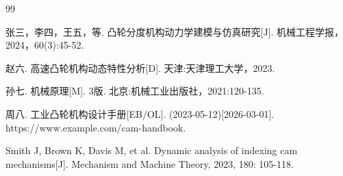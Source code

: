 \begin{thebibliography}{99}

 张三，李四，王五，等. 凸轮分度机构动力学建模与仿真研究[J]. 机械工程学报，2024，60(3):45-52.

 赵六. 高速凸轮机构动态特性分析[D]. 天津:天津理工大学，2023.

 孙七. 机械原理[M]. 3版. 北京:机械工业出版社，2021:120-135.

 周八. 工业凸轮机构设计手册[EB/OL]. (2023-05-12)[2026-03-01]. https://www.example.com/cam-handbook.

 Smith J, Brown K, Davis M, et al. Dynamic analysis of indexing cam mechanisms[J]. Mechanism and Machine Theory, 2023, 180: 105-118.

\end{thebibliography}

